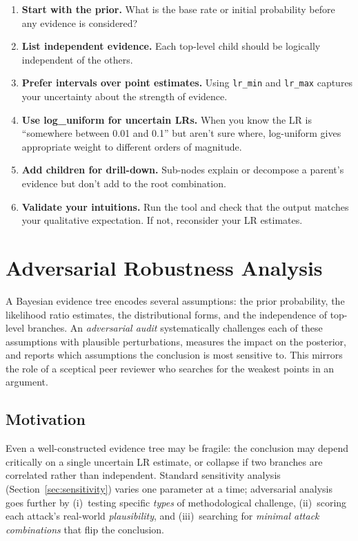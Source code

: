 \documentclass[11pt,a4paper]{article}
\begin{document}
\begin{enumerate}
\item \textbf{Start with the prior.} What is the base rate or initial
  probability before any evidence is considered?
\item \textbf{List independent evidence.} Each top-level child should be
  logically independent of the others.
\item \textbf{Prefer intervals over point estimates.} Using \texttt{lr\_min}
  and \texttt{lr\_max} captures your uncertainty about the strength of
  evidence.
\item \textbf{Use log\_uniform for uncertain LRs.} When you know the LR is
  ``somewhere between 0.01 and 0.1'' but aren't sure where, log-uniform
  gives appropriate weight to different orders of magnitude.
\item \textbf{Add children for drill-down.} Sub-nodes explain or decompose
  a parent's evidence but don't add to the root combination.
\item \textbf{Validate your intuitions.} Run the tool and check that the
  output matches your qualitative expectation. If not, reconsider your LR
  estimates.
\end{enumerate}

\section{Adversarial Robustness Analysis}

A Bayesian evidence tree encodes several assumptions: the prior probability,
the likelihood ratio estimates, the distributional forms, and the independence
of top-level branches.  An \emph{adversarial audit} systematically challenges
each of these assumptions with plausible perturbations, measures the impact on
the posterior, and reports which assumptions the conclusion is most sensitive
to.  This mirrors the role of a sceptical peer reviewer who searches for the
weakest points in an argument.

\subsection{Motivation}

Even a well-constructed evidence tree may be fragile: the conclusion may depend
critically on a single uncertain LR estimate, or collapse if two branches are
correlated rather than independent.  Standard sensitivity analysis
(Section~\ref{sec:sensitivity}) varies one parameter at a time; adversarial
analysis goes further by (i)~testing specific \emph{types} of methodological
challenge, (ii)~scoring each attack's real-world \emph{plausibility}, and
(iii)~searching for \emph{minimal attack combinations} that flip the
conclusion.
\end{document}
